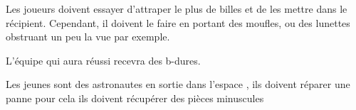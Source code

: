 \documentclass{grand-jeu}
\begin{document}
\begin{liste-materiel}
\end{liste-materiel}

\begin{regles}
Les joueurs doivent essayer d'attraper le plus de billes et de les mettre dans le récipient. Cependant, il doivent le faire en portant des moufles, ou des lunettes obstruant un peu la vue par exemple.

L’équipe qui aura réussi recevra des b-dures.
\end{regles}

\begin{imaginaire}
Les jeunes sont des astronautes en sortie dans l’espace , ils doivent réparer une panne pour cela ils doivent récupérer des pièces minuscules
\end{imaginaire}

\begin{moments-stop}
\end{moments-stop}
\end{document}
